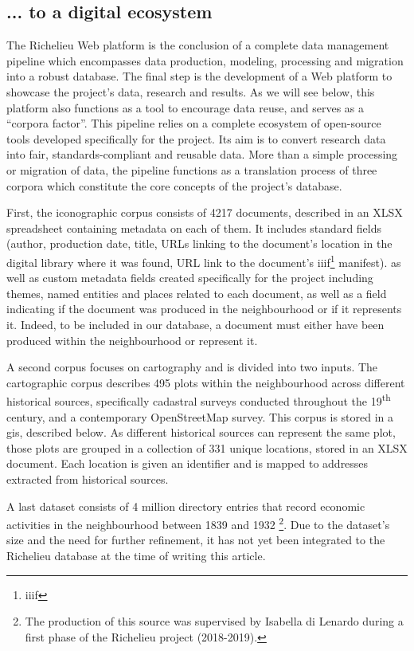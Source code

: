 \documentclass[12pt, a4paper, twocolumn]{article}
\begin{document}
\subsection{... to a digital ecosystem}

The Richelieu Web platform is the conclusion of a complete data management pipeline which encompasses data production, modeling, processing and migration into a robust database. The final step is  the development of a Web platform to showcase the project's data, research and results. As we will see below, this platform also functions as a tool to encourage data reuse, and serves as a ``corpora factor''. This pipeline relies on a complete ecosystem of open-source tools developed specifically for the project. Its aim is to convert research data into \ac{fair}, standards-compliant and reusable data. More than a simple processing or migration of data, the pipeline functions as a translation process of three corpora which constitute the core concepts of the project's database. 

First, the  iconographic corpus consists of 4217 documents, described in an XLSX spreadsheet containing metadata on each of them. It includes standard fields (author, production date, title, URLs linking to the document's location in the digital library where it was found, URL link to the document's \acs{iiif}\footnote{\acl{iiif}} manifest). as well as custom metadata fields created specifically for the project including themes, named entities and places related to each document, as well as a field indicating if the document was produced in the neighbourhood or if it represents it. Indeed, to be included in our database, a document must either have been produced within the neighbourhood or represent it.

A second corpus focuses on cartography and is divided into two inputs. The cartographic corpus describes 495 plots within the neighbourhood across  different historical sources, specifically cadastral surveys conducted throughout the 19\textsuperscript{th} century, and a contemporary OpenStreetMap survey. This corpus is stored in a \ac{gis}, described below. As different historical sources can represent the same plot, those plots are grouped in a  collection of 331 unique locations, stored in an XLSX document. Each location is given an identifier and is mapped to addresses extracted from historical sources.

A last dataset consists of 4 million directory entries that record economic activities in the neighbourhood between 1839 and 1932 \parencite{dilenardoRepopulatingParisMassive2019}\footnote{The production of this source was supervised by Isabella di Lenardo during a first phase of the Richelieu project (2018-2019).}. Due to the dataset's size and the need for further refinement, it has not yet been integrated to the Richelieu database at the time of writing this article.
\end{document}
